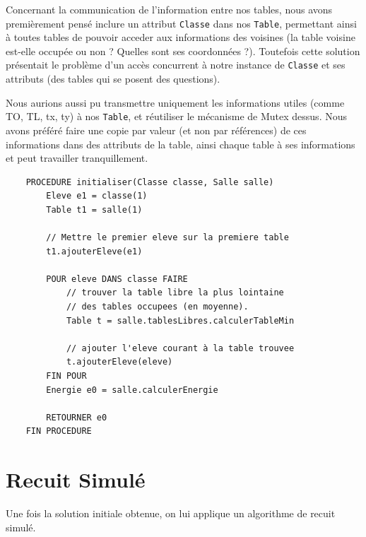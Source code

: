 \documentclass[11pt,a4paper, openany]{book}
\begin{document}
Concernant la communication de l'information entre nos tables, nous avons premièrement pensé inclure un attribut \texttt{Classe} dans nos \texttt{Table}, permettant ainsi à toutes tables de pouvoir acceder aux informations des voisines (la table voisine est-elle occupée ou non ? Quelles sont ses coordonnées ?). Toutefois cette solution présentait le problème d'un accès concurrent à notre instance de \texttt{Classe} et ses attributs (des tables qui se posent des questions).

Nous aurions aussi pu transmettre uniquement les informations utiles (comme TO, TL, tx, ty) à nos \texttt{Table}, et réutiliser le mécanisme de Mutex dessus.
Nous avons préféré faire une copie par valeur (et non par références) de ces informations dans des attributs de la table, ainsi chaque table à ses informations et peut travailler tranquillement.

\begin{verbatim}
    PROCEDURE initialiser(Classe classe, Salle salle)
        Eleve e1 = classe(1)
        Table t1 = salle(1)
        
        // Mettre le premier eleve sur la premiere table
        t1.ajouterEleve(e1)
        
        POUR eleve DANS classe FAIRE
        	// trouver la table libre la plus lointaine
        	// des tables occupees (en moyenne).
        	Table t = salle.tablesLibres.calculerTableMin
        
        	// ajouter l'eleve courant à la table trouvee
        	t.ajouterEleve(eleve)
        FIN POUR    
        Energie e0 = salle.calculerEnergie
        
        RETOURNER e0
    FIN PROCEDURE
\end{verbatim}

\section{Recuit Simulé}
\label{recuit}

Une fois la solution initiale obtenue, on lui applique un algorithme de recuit simulé.
\end{document}
